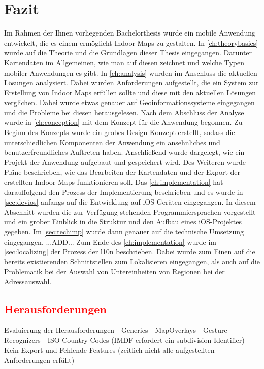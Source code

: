 \chapter{Fazit}
\label{ch:conclusion}
Im Rahmen der Ihnen vorliegenden Bachelorthesis wurde ein mobile Anwendung entwickelt, die es einem ermöglicht Indoor Maps zu gestalten.
In \autoref{ch:theorybasics} wurde auf die Theorie und die Grundlagen dieser Thesis eingegangen.
Darunter Kartendaten im Allgemeinen, wie man auf diesen zeichnet und welche Typen mobiler Anwendungen es gibt.\pbreak%
%
In \autoref{ch:analysis} wurden im Anschluss die aktuellen Lösungen analysiert.
Dabei wurden Anforderungen aufgestellt, die ein System zur Erstellung von Indoor Maps erfüllen sollte und diese mit den aktuellen Lösungen verglichen.
Dabei wurde etwas genauer auf Geoinformationssysteme eingegangen und die Probleme bei diesen herausgelesen.\pbreak%
%
Nach dem Abschluss der Analyse wurde in \autoref{ch:conception} mit dem Konzept für die Anwendung begonnen.
Zu Beginn des Konzepts wurde ein grobes Design-Konzept erstellt, sodass die unterschiedlichen Komponenten der Anwendung ein ansehnliches und benutzerfreundliches Auftreten haben.
Anschließend wurde dargelegt, wie ein Projekt der Anwendung aufgebaut und gespeichert wird.
Des Weiteren wurde Pläne beschrieben, wie das Bearbeiten der Kartendaten und der Export der erstellten Indoor Maps funktionieren soll.\pbreak%
%
Das \autoref{ch:implementation} hat darauffolgend den Prozess der Implementierung beschrieben und es wurde in \autoref{sec:devios} anfangs auf die Entwicklung auf iOS-Geräten eingegangen.
In diesem Abschnitt wurden die zur Verfügung stehenden Programmiersprachen vorgestellt und ein grober Einblick in die Struktur und den Aufbau eines iOS-Projektes gegeben.
Im \autoref{sec:techimp} wurde dann genauer auf die technische Umsetzung eingegangen.
...ADD...\pbreak%
%
Zum Ende des \autoref{ch:implementation} wurde im \autoref{sec:localizing} der Prozess der \Gls{l10n} beschrieben.
Dabei wurde zum Einen auf die bereits existierenden Schnittstellen zum Lokalisieren eingegangen, als auch auf die Problematik bei der Auswahl von Untereinheiten von Regionen bei der Adressauswahl.

\section{\textcolor{red}{Herausforderungen}}
Evaluierung der Herausforderungen
- Generics
- MapOverlays
- Gesture Recognizers
- ISO Country Codes (IMDF erfordert ein subdivision Identifier)
- Kein Export und Fehlende Features (zeitlich nicht alle aufgestellten Anforderungen erfüllt)

